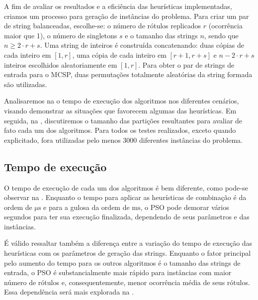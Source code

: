 A fim de avaliar os resultados e a eficiência das heurísticas implementadas, criamos um processo para geração de instâncias do problema. Para criar um par de string balanceadas, escolhe-se: o número de rótulos replicados $r$ (ocorrência maior que 1), o número de singletons $s$ e o tamanho das strings $n$, sendo que $n \ge 2 \cdot r + s$. Uma string de inteiros é construída concatenando: duas cópias de cada inteiro em $[1, r]$, uma cópia de cada inteiro em $[r + 1, r + s]$ e $n - 2 \cdot r + s$ inteiros escolhidos aleatoriamente em $[1, r]$. Para obter o par de strings de entrada para o MCSP, duas permutações totalmente aleatórias da string formada são utilizadas.

Analisaremos na  o tempo de execução dos algoritmos nos diferentes cenários, visando demonstrar as situações que favorecem algumas das heurísticas. Em seguida, na , discutiremos o tamanho das partições resultantes para avaliar de fato cada um dos algoritmos. Para todos os testes realizados, exceto quando explicitado, fora utilizadas pelo menos 3000 diferentes instâncias do problema.

\subsection{Tempo de execução} \label{sec:resultados-tempo}

    O tempo de execução de cada um dos algoritmos é bem diferente, como pode-se observar na . Enquanto o tempo para aplicar as heurísticas de combinação é da ordem de $\unit{\micro\second}$ e para a gulosa da ordem de $\unit{\milli\second}$, o PSO pode demorar vários segundos para ter sua execução finalizada, dependendo de seus parâmetros e das instâncias.

    É válido ressaltar também a diferença entre a variação do tempo de execução das heurísticas com os parâmetros de geração das strings. Enquanto o fator principal pelo aumento do tempo para os outros algoritmos é o tamanho das strings de entrada, o PSO é substancialmente mais rápido para instâncias com maior número de rótulos e, consequentemente, menor ocorrência média de seus rótulos. Essa dependência será mais explorada na .
    
